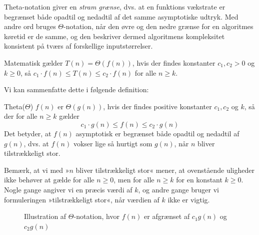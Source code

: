 Theta-notation giver en \textit{stram grænse}, dvs. at en funktions vækstrate er begrænset både opadtil og nedadtil af det samme asymptotiske udtryk. Med andre ord bruges $\Theta$-notation, når den øvre og den nedre grænse for en algoritmes køretid er de samme, og den beskriver dermed algoritmens kompleksitet konsistent på tværs af forskellige inputstørrelser.

Matematisk gælder $T(n) = \Theta(f(n))$, hvis der findes konstanter $c_1, c_2 > 0$ og $k \geq 0$, så $c_1 \cdot f(n) \leq T(n) \leq c_2 \cdot f(n)$ for alle $n \geq k$.

Vi kan sammenfatte dette i følgende definition:

\begin{definition}{Theta(\(\Theta\))}
    $f(n)$ er $\Theta(g(n))$, hvis der findes positive konstanter $c_1, c_2$ og $k$, så der for alle $n \geq k$ gælder
    \medskip
    \[
    c_1 \cdot g(n) \leq f(n) \leq c_2 \cdot g(n)
    \]
    \medskip
Det betyder, at $f(n)$ asymptotisk er begrænset både opadtil og nedadtil af $g(n)$, dvs. at $f(n)$ vokser lige så hurtigt som $g(n)$, når $n$ bliver tilstrækkeligt stor.
\label{def:theta_notation}
\end{definition}

Bemærk, at vi med »$n$ bliver tilstrækkeligt stor« mener, at ovenstående uligheder ikke behøver at gælde for alle $n \geq 0$, men for alle $n \geq k$ for en konstant $k \geq 0$. Nogle gange angiver vi en præcis værdi af $k$, og andre gange bruger vi formuleringen »tilstrækkeligt stor«, når værdien af $k$ ikke er vigtig.

\begin{figure}[htbp]
    \centering
    \caption{Illustration af \(\Theta\)-notation, hvor \( f(n) \) er afgrænset af \( c_1 g(n) \) og \( c_2 g(n) \)}
    \label{fig:theta_notation}
\end{figure}

